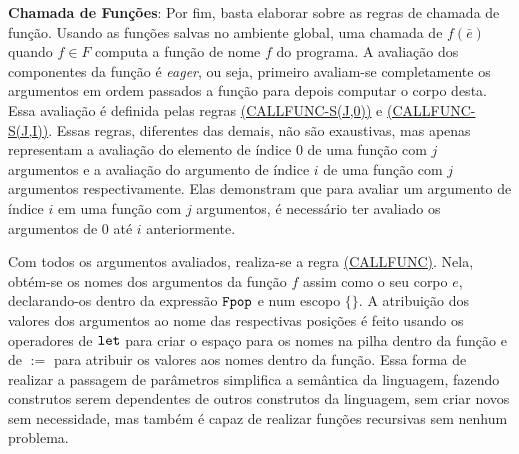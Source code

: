 \textbf{Chamada de Funções}: Por fim, basta elaborar sobre as regras de chamada de função. Usando as funções salvas no ambiente global, uma chamada de $f(\bar e)$ quando $f \in F$ computa a função de nome $f$ do programa. A avaliação dos componentes da função é \emph{eager}, ou seja, primeiro avaliam-se completamente os argumentos em ordem passados a função para depois computar o corpo desta. Essa avaliação é definida pelas regras \hyperref[rule:callfunc-s(j,0)]{(CALLFUNC-S(J,0))} e \hyperref[rule:callfunc-s(j,i)]{(CALLFUNC-S(J,I))}. Essas regras, diferentes das demais, não são exaustivas, mas apenas representam a avaliação do elemento de índice 0 de uma função com $j$ argumentos e a avaliação do argumento de índice $i$ de uma função com $j$ argumentos respectivamente. Elas demonstram que para avaliar um argumento de índice $i$ em uma função com $j$ argumentos, é necessário ter avaliado os argumentos de 0 até $i$ anteriormente.

Com todos os argumentos avaliados, realiza-se a regra \hyperref[rule:callfunc]{(CALLFUNC)}. Nela, obtém-se os nomes dos argumentos da função $f$ assim como o seu corpo $e$, declarando-os dentro da expressão $\texttt{Fpop}$ e num escopo $\{\}$. A atribuição dos valores dos argumentos ao nome das respectivas posições é feito usando os operadores de $\texttt{let}$ para criar o espaço para os nomes na pilha dentro da função e de $:=$ para atribuir os valores aos nomes dentro da função. Essa forma de realizar a passagem de parâmetros simplifica a semântica da linguagem, fazendo construtos serem dependentes de outros construtos da linguagem, sem criar novos sem necessidade, mas também é capaz de realizar funções recursivas sem nenhum problema.




